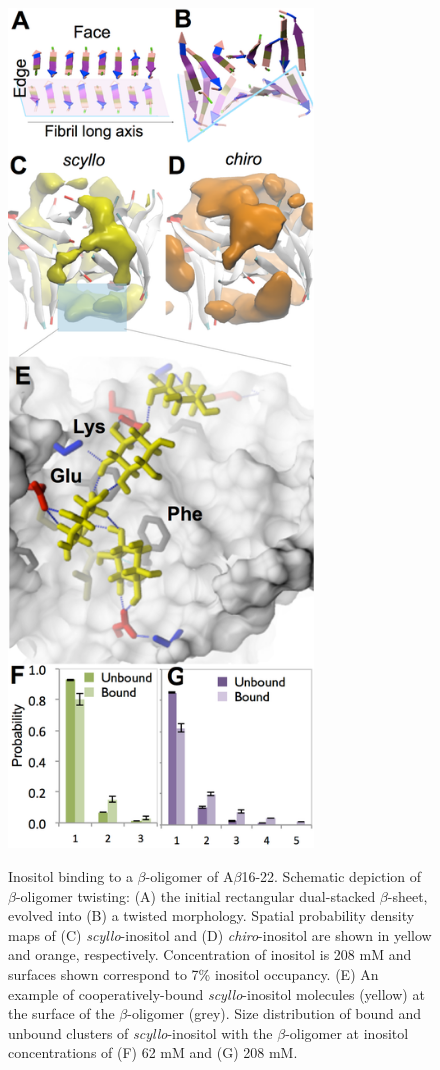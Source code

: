 \begin{figure}
\includegraphics[width=8.1cm]{figures/results2/inos2_figures_beta.pdf}
\end{figure}
\begin{figure}[t!]
\caption[Inositol binding to a $\beta$-oligomer of A$\beta$16-22]{Inositol binding to a $\beta$-oligomer of A$\beta$16-22. Schematic depiction of $\beta$-oligomer twisting: (A) the initial rectangular dual-stacked $\beta$-sheet, evolved into (B) a twisted morphology. Spatial probability density maps of (C) \emph{scyllo}-inositol and (D) \emph{chiro}-inositol are shown in yellow and orange, respectively.  Concentration of inositol is 208 mM and surfaces shown correspond to 7\% inositol occupancy. (E) An example of cooperatively-bound \emph{scyllo}-inositol molecules (yellow) at the surface of the $\beta$-oligomer (grey). Size distribution of bound and unbound clusters of \emph{scyllo}-inositol with the $\beta$-oligomer at inositol concentrations of (F) 62 mM and (G) 208 mM.}
\label{fig:beta}
\end{figure}

